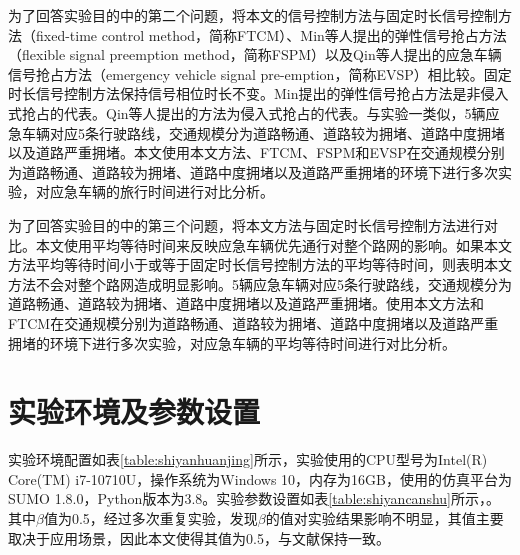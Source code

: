 为了回答实验目的中的第二个问题，将本文的信号控制方法与固定时长信号控制方法（fixed-time control method，简称FTCM）、Min等人\cite{min}提出的弹性信号抢占方法（flexible signal preemption  method，简称FSPM）以及Qin等人\cite{qin_control_2012}提出的应急车辆信号抢占方法（emergency vehicle signal pre-emption，简称EVSP）相比较。固定时长信号控制方法保持信号相位时长不变。Min提出的弹性信号抢占方法是非侵入式抢占的代表。Qin等人提出的方法为侵入式抢占的代表。与实验一类似，5辆应急车辆对应5条行驶路线，交通规模分为道路畅通、道路较为拥堵、道路中度拥堵以及道路严重拥堵。本文使用本文方法、FTCM、FSPM和EVSP在交通规模分别为道路畅通、道路较为拥堵、道路中度拥堵以及道路严重拥堵的环境下进行多次实验，对应急车辆的旅行时间进行对比分析。

为了回答实验目的中的第三个问题，将本文方法与固定时长信号控制方法进行对比。本文使用平均等待时间来反映应急车辆优先通行对整个路网的影响。如果本文方法平均等待时间小于或等于固定时长信号控制方法的平均等待时间，则表明本文方法不会对整个路网造成明显影响。5辆应急车辆对应5条行驶路线，交通规模分为道路畅通、道路较为拥堵、道路中度拥堵以及道路严重拥堵。使用本文方法和FTCM在交通规模分别为道路畅通、道路较为拥堵、道路中度拥堵以及道路严重拥堵的环境下进行多次实验，对应急车辆的平均等待时间进行对比分析。


\section{实验环境及参数设置}
实验环境配置如表\ref{table:shiyanhuanjing}所示，实验使用的CPU型号为Intel(R) Core(TM) i7-10710U，操作系统为Windows 10，内存为16GB，使用的仿真平台为SUMO 1.8.0，Python版本为3.8。实验参数设置如表\ref{table:shiyancanshu}所示，。其中${\beta}$值为0.5，经过多次重复实验，发现${\beta}$的值对实验结果影响不明显，其值主要取决于应用场景，因此本文使得其值为0.5，与文献\cite{min}保持一致。




